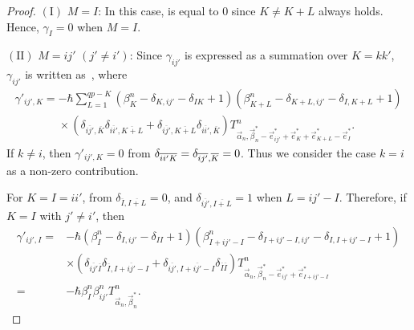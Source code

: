 \documentclass[10pt,a4paper]{amsart}
\numberwithin{equation}{section}
\begin{document}
\begin{proof}
$(\textrm{I})$ $M=I$: In this case,
is equal to 0 since
$
 K
 \neq
 K+L
$
always holds. Hence, $\gamma_{I}=0$ when $M=I$.


 $(\textrm{II})$
 $M=ij'$
 $(
 j'
 \neq
 i'
 )$:
Since $\gamma_{ij'}$ is expressed as a summation over $K=kk'$,
$\gamma_{ij'}$ is written as~,
where
\begin{gather}
 \gamma'_{ij',K}
 =
 -
 \hbar
 \sum_{L=1}^{qp-K}
 (
 \beta_{K}^{n}
 -
 \delta_{K,ij'}
 -
 \delta_{IK}
 +
 1
 )
 (
 \beta_{K+L}^{n}
 -
 \delta_{K+L,ij'}
 -
 \delta_{I,K+L}
 +
 1
 )
 \nonumber
 \\
\phantom{ \gamma'_{ij',K}
 =}{}
 \times
 (
 \delta_{
 \overline{ij'},
 \overline{K}
 }
 \delta_{
 \overline{ii'},
 \overline{K+L}
 }
 +
 \delta_{
 \overline{ij'},
 \overline{K+L}
 }
 \delta_{
 \overline{ii'},
 \overline{K}
 }
 )
 T^{n}_{\vec{\alpha}_{n},\vec{\beta}_{n}^{\ast}-\vec{e}_{ij'}^{\ast}+\vec{e}_{K}^{\ast}+\vec{e}_{K+L}^{\ast}-\vec{e}_{I}^{\ast}}.
\label{gamma_ij}
\end{gather}
If
$
 k
 \neq
 i
$,
then $\gamma'_{ij',K}=0$
from
$
 \delta_{
 \overline{ii'}
 \overline{K}
 }
 =
 \delta_{
 \overline{ij'},
 \overline{K}
 }
 =
 0
$.
Thus we consider the case
$
 k
 =
 i
$
as a non-zero contribution.



For
$
 K
 =
 I
 =
 ii'
$,
from
$
 \delta_{
 \overline{I},
 \overline{I+L}
 }
 =
 0
$,
and
$
 \delta_{
 \overline{ij'},
 \overline{I+L}
 }
 =
 1
$
when
$
L
=
ij'
-
I
$.
Therefore, if $K=I$ with
$
j'
\neq
i'
$,
then
\begin{align*}
 \gamma'_{ij',I}
={}&
 -
 \hbar
 (
 \beta_{I}^{n}
 -
 \delta_{I,ij'}
 -
 \delta_{II}
 +
 1
 )
 (
 \beta_{I+ij'-I}^{n}
 -
 \delta_{I+ij'-I,ij'}
 -
 \delta_{I,I+ij'-I}
 +
 1
 )
 \nonumber
 \\
 &
 \times
 (
 \delta_{
 \overline{ij'}
 \overline{I}
 }
 \delta_{
 \overline{I},
 \overline{I+ij'-I}
 }
 +
 \delta_{
 \overline{ij'},
 \overline{I+ij'-I}
 }
 \delta_{
 \overline{I}
 \overline{I}
 }
 )
 T^{n}_{\vec{\alpha}_{n},\vec{\beta}_{n}^{\ast}-\vec{e}_{ij'}^{\ast}+\vec{e}_{I+ij'-I}^{\ast}}
 \\
={}&
 -
 \hbar
 \beta_{I}^{n}
 \beta_{ij'}^{n}
 T^{n}_{\vec{\alpha}_{n},\vec{\beta}_{n}^{\ast}}
 .
\end{align*}



\end{proof}
\end{document}
